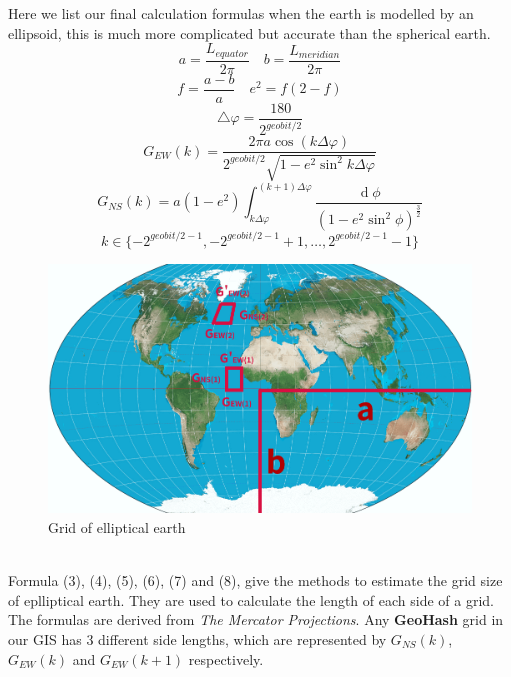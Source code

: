 \documentclass[sigplan,screen]{acmart}
\begin{document}
Here we list our final calculation formulas when the earth is modelled by an ellipsoid, this is much more complicated but accurate than the spherical earth.
\begin{equation}
	a=\frac{L_{equator}}{2\pi}\quad b=\frac{L_{meridian}}{2\pi}
\end{equation}
\begin{equation}
	f=\frac{a-b}{a}\quad e^2=f(2-f)
\end{equation}
\begin{equation}
	\bigtriangleup\varphi=\frac{180}{2^{geobit/2}}
\end{equation}
\begin{equation}
	G_{EW}(k)=\frac{2\pi a\cos(k\Delta\varphi)}{2^{geobit/2}\sqrt{1-e^2\sin^2k\Delta\varphi}}
\end{equation}
\begin{equation}
	G_{NS}(k)=a(1-e^2)\int_{k\Delta\varphi}^{(k+1)\Delta\varphi}\frac{\operatorname d\phi}{{(1-e^2\sin^2\phi)}^\frac32}
\end{equation}
\begin{equation}
	k\in\{-2^{geobit/2-1}, -2^{geobit/2-1}+1, \ldots, 2^{geobit/2-1}-1\}
\end{equation}
\begin{figure}[htb]
	\centering\includegraphics[width=\linewidth]{earth.png}
	\caption{Grid of elliptical earth}
\end{figure}
\\
Formula (3), (4), (5), (6), (7) and (8), give the methods to estimate the grid size of eplliptical earth.
They are used to calculate the length of each side of a grid.
The formulas are derived from \textit{The Mercator Projections}\cite{osborne2013mercator}.
Any \textbf{GeoHash} grid in our GIS has 3 different side lengths, which are represented by $G_{NS}(k)$, $G_{EW}(k)$ and $G_{EW}(k+1)$ respectively.
\end{document}
